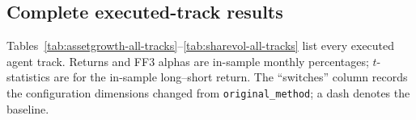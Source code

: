 \subsection{Complete executed-track results}

Tables~\ref{tab:assetgrowth-all-tracks}--\ref{tab:sharevol-all-tracks}
list every executed agent track. Returns and FF3 alphas are in-sample monthly
percentages; $t$-statistics are for the in-sample long--short return. The
``switches'' column records the configuration dimensions changed from
\texttt{original\_method}; a dash denotes the baseline.

\begin{table}[htbp]
  \centering\scriptsize
  \setlength{\tabcolsep}{3pt}
  \caption{All executed AssetGrowth tracks.}
  \label{tab:assetgrowth-all-tracks}
\end{table}

